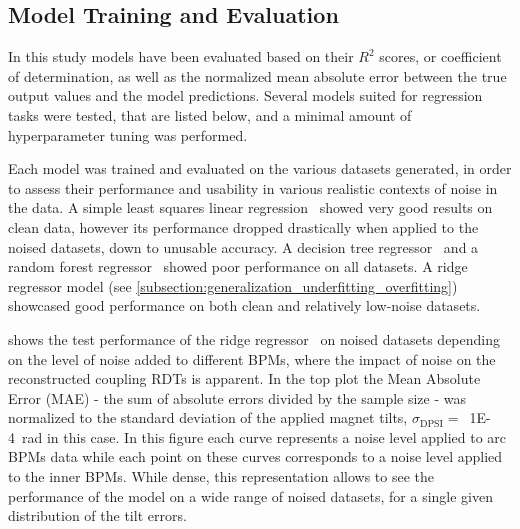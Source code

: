 \subsection{Model Training and Evaluation}

In this study models have been evaluated based on their \(R^2\) scores, or coefficient of determination, as well as the normalized mean absolute error between the true output values and the model predictions.
Several models suited for regression tasks were tested, that are listed below, and a minimal amount of hyperparameter tuning was performed.

Each model was trained and evaluated on the various datasets generated, in order to assess their performance and usability in various realistic contexts of noise in the data. 
A simple least squares linear regression~\cite{PNAS:Lai:Strong_Consistency_Least_Squares_Estimates_Regression_Models} showed very good results on clean data, however its performance dropped drastically when applied to the noised datasets, down to unusable accuracy.
A decision tree regressor~\cite{BOOK:Breiman:Classification_Regression_Trees} and a random forest regressor~\cite{ML:Breiman:Random_Forests} showed poor performance on all datasets.
A ridge regressor model (see \cref{subsection:generalization_underfitting_overfitting}) showcased good performance on both clean and relatively low-noise datasets.

 shows the test performance of the ridge regressor~\cite{MIT:Rifkin:Regularized_Least_Squares} on noised datasets depending on the level of noise added to different BPMs, where the impact of noise on the reconstructed coupling RDTs is apparent.
In the top plot the Mean Absolute Error (MAE) - the sum of absolute errors divided by the sample size - was normalized to the standard deviation of the applied magnet tilts, \(\sigma_{\mathrm{DPSI}} =\)~\qty{1E-4}{\radian} in this case.
In this figure each curve represents a noise level applied to arc BPMs data while each point on these curves corresponds to a noise level applied to the inner BPMs.
While dense, this representation allows to see the performance of the model on a wide range of noised datasets, for a single given distribution of the tilt errors.

